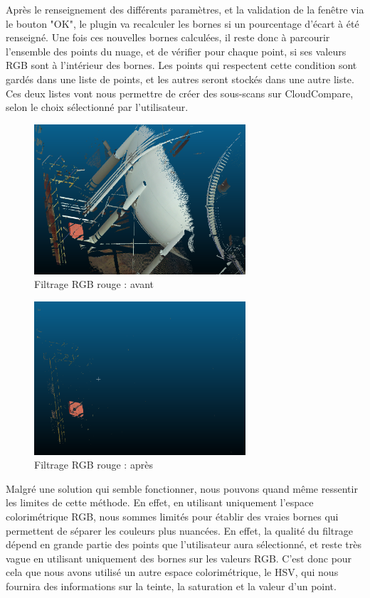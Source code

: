 \documentclass[12pt,titlepage,french]{article}
\begin{document}
Après le renseignement des différents paramètres, et la validation de la fenêtre via le bouton "OK", le plugin va recalculer les bornes si un pourcentage d'écart à été renseigné. Une fois ces nouvelles bornes calculées, il reste donc à parcourir l'ensemble des points du nuage, et de vérifier pour chaque point, si ses valeurs RGB sont à l'intérieur des bornes. Les points qui respectent cette condition sont gardés dans une liste de points, et les autres seront stockés dans une autre liste. Ces deux listes vont nous permettre de créer des sous-scans sur CloudCompare, selon le choix sélectionné par l'utilisateur.\newline

\begin{figure}[H]
\center
\includegraphics[width=0.7\textwidth]{./img/ex_rgb_avant.PNG}
\caption{\label{} Filtrage RGB rouge : avant}
\end{figure}

\begin{figure}[H]
\center
\includegraphics[width=0.7\textwidth]{./img/ex_rgb_apres.PNG}
\caption{\label{} Filtrage RGB rouge : après}
\end{figure}

Malgré une solution qui semble fonctionner, nous pouvons quand même ressentir les limites de cette méthode. En effet, en utilisant uniquement l'espace colorimétrique RGB, nous sommes limités pour établir des vraies bornes qui permettent de séparer les couleurs plus nuancées. En effet, la qualité du filtrage dépend en grande partie des points que l'utilisateur aura sélectionné, et reste très vague en utilisant uniquement des bornes sur les valeurs RGB. C'est donc pour cela que nous avons utilisé un autre espace colorimétrique, le HSV, qui nous fournira des informations sur la teinte, la saturation et la valeur d'un point.
\end{document}
